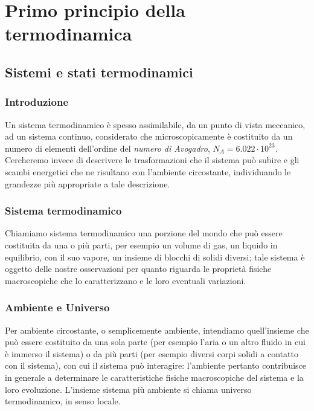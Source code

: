 \documentclass[class=book, crop=false, oneside, 12pt]{standalone}
\begin{document}
\chapter{Primo principio della termodinamica}

\section{Sistemi e stati termodinamici}

\subsection{Introduzione}

Un sistema termodinamico è spesso assimilabile, da un punto di vista meccanico, ad un sistema continuo, considerato che microscopicamente è costituito da un numero di elementi dell'ordine del \emph{numero di Avogadro}, \(N_A = 6.022 \cdot 10^{23}\).
Cercheremo invece di descrivere le trasformazioni che il sistema può subire e gli scambi energetici che ne risultano con l'ambiente circostante, individuando le grandezze più appropriate a tale descrizione.

\subsection{Sistema termodinamico}

Chiamiamo sistema termodinamico una porzione del mondo che può essere costituita da una o più parti, per esempio un volume di gas, un liquido in equilibrio, con il suo vapore, un insieme di blocchi di solidi diversi; tale sistema è oggetto delle nostre osservazioni per quanto riguarda le proprietà fisiche macroscopiche che lo caratterizzano e le loro eventuali variazioni. 

\subsection{Ambiente e Universo}

Per ambiente circostante, o semplicemente ambiente, intendiamo quell'insieme che può essere costituito da una sola parte (per esempio l'aria o un altro fluido in cui è immerso il sistema) o da più parti (per esempio diversi corpi solidi a contatto con il sistema), con cui il sistema può interagire: l'ambiente pertanto contribuisce in generale a determinare le caratteristiche fisiche macroscopiche del sistema e la loro evoluzione.\newline
L'insieme sistema più ambiente si chiama universo termodinamico, in senso locale.
\end{document}
